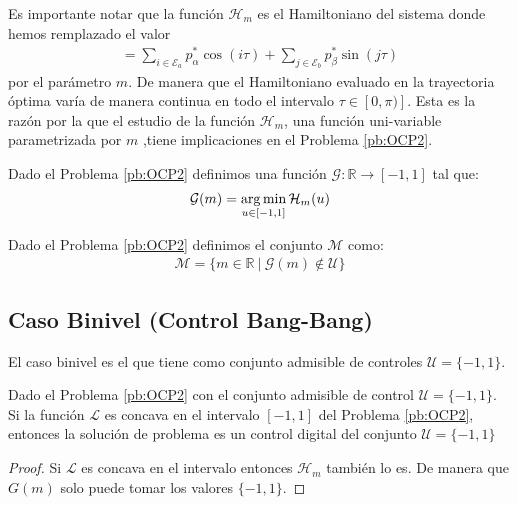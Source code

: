 Es importante notar que la función $\mathcal{H}_m$ es el Hamiltoniano del sistema donde hemos remplazado el valor 
\begin{gather}
	[\bm{p}^* \cdot \bm{\mathcal{D}}(\tau)] = \sum_{i \in \mathcal{E}_a} p^*_\alpha \cos(i\tau) + \sum_{j \in \mathcal{E}_b} p^*_\beta \sin(j\tau) 
\end{gather}
por el parámetro $m$. De manera que el Hamiltoniano evaluado en la trayectoria óptima varía de manera continua en todo el intervalo $\tau \in [0,\pi)]$. 
%
Esta es la razón por la que el estudio de la función $\mathcal{H}_m$, una función uni-variable parametrizada por $m$ ,tiene implicaciones en el Problema \ref{pb:OCP2}.
\newline

\begin{definition}
    Dado el Problema \ref{pb:OCP2}  definimos una función $\mathcal{G}:\mathbb{R} \rightarrow [-1,1]$ tal que:
    \begin{gather}
        \mathcal{G}(m) = \operatorname*{arg\,min}_{u \in [-1,1]} \mathcal{H}_m(u)
    \end{gather}
\end{definition}
\begin{definition}
    Dado el Problema \ref{pb:OCP2} definimos el conjunto $\mathcal{M}$ como:
    \begin{gather}
        \mathcal{M} = \{m \in \mathbb{R}\ | \ \mathcal{G}(m) \notin \mathcal{U} \}
    \end{gather}
\end{definition}
\subsection{Caso Binivel (Control Bang-Bang)}
El caso binivel es el que tiene como conjunto admisible de controles $\mathcal{U}= \{-1,1\}$.
\vspace{1em}

\begin{proposition}
    Dado el Problema \ref{pb:OCP2} con el conjunto admisible de control $\mathcal{U} = \{-1,1\}$. Si la función $\mathcal{L}$ es concava en el intervalo $[-1,1]$ del Problema \ref{pb:OCP2}, entonces la solución de problema es un control digital del conjunto $\mathcal{U} =  \{-1,1\}$
\end{proposition}
\begin{proof}
    Si $\mathcal{L}$ es concava en el intervalo entonces $\mathcal{H}_m$ también lo es. De manera que $G(m)$ solo puede tomar los valores $\{-1,1\}$.
\end{proof}
